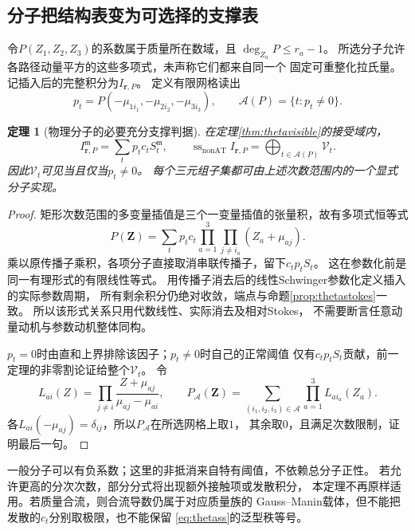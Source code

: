 \documentclass[11pt,a4paper]{ctexart}
\theoremstyle{cnplain}\newtheorem{theorem}{定理}[section]
\theoremstyle{definition}\newtheorem{definition}[theorem]{定义}
\theoremstyle{remark}\newtheorem{remark}[theorem]{注}
\begin{document}
\subsection{分子把结构表变为可选择的支撑表}
令$P(Z_1,Z_2,Z_3)$的系数属于质量所在数域，且
$\deg_{Z_a}P\le r_a-1$。
所选分子允许各路径动量平方的这些多项式，未声称它们都来自同一个
固定可重整化拉氏量。记插入后的完整积分为$I_{\mathbf r,P}$。
定义有限网格读出
\[
 p_t=P(-\mu_{1i_1},-\mu_{2i_2},-\mu_{3i_3}),\qquad
 \mathcal A(P)=\{t:p_t\ne0\}.
\]

\begin{theorem}[物理分子的必要充分支撑判据]\label{thm:thetanumerator}
在定理\ref{thm:thetavisible}的接受域内，
\begin{equation}\label{eq:thetapinsert}
 I_{\mathbf r,P}^{\mathfrak m}=\sum_t p_tc_tS_t^{\mathfrak m},
 \qquad
 \operatorname{ss}_{\mathrm{nonAT}} I_{\mathbf r,P}
       =\bigoplus_{t\in\mathcal A(P)}\mathcal V_t .
\end{equation}
因此$\mathcal V_t$可见当且仅当$p_t\ne0$。
每个三元组子集都可由上述次数范围内的一个显式分子实现。
\end{theorem}
\begin{proof}
矩形次数范围的多变量插值是三个一变量插值的张量积，故有多项式恒等式
\[
 P(\mathbf Z)=\sum_t p_tc_t
       \prod_{a=1}^3\prod_{j\ne i_a}(Z_a+\mu_{aj}).
\]
乘以原传播子乘积，各项分子直接取消串联传播子，留下$c_tp_tS_t$。
这在参数化前是同一有理形式的有限线性等式。
用传播子消去后的线性Schwinger参数化定义插入的实际参数周期，
所有剩余积分仍绝对收敛，端点与命题\ref{prop:thetastokes}一致。
所以该形式关系只用代数线性、实际消去及相对Stokes，
不需要断言任意动量动机与参数动机整体同构。

$p_t=0$时由直和上界排除该因子；$p_t\ne0$时自己的正常阈值
仅有$c_tp_tS_t$贡献，前一定理的非零割论证给整个$\mathcal V_t$。
令
\[
 L_{ai}(Z)=
 \prod_{j\ne i}\frac{Z+\mu_{aj}}{\mu_{aj}-\mu_{ai}} ,
 \qquad
 P_{\mathcal A}(\mathbf Z)=
       \sum_{(i_1,i_2,i_3)\in\mathcal A}\prod_{a=1}^3L_{ai_a}(Z_a).
\]
各$L_{ai}(-\mu_{aj})=\delta_{ij}$，所以$P_{\mathcal A}$在所选网格上取$1$，
其余取$0$，且满足次数限制，证明最后一句。
\end{proof}

一般分子可以有负系数；这里的非抵消来自特有阈值，不依赖总分子正性。
若允许更高的分次次数，部分分式将出现额外接触项或发散积分，
本定理不再原样适用。若质量合流，则合流导数仍属于对应质量族的
Gauss--Manin载体，但不能把发散的$c_t$分别取极限，也不能保留
\eqref{eq:thetass}的泛型秩等号。
\end{document}
